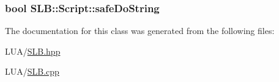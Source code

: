 \subsubsection[{\texorpdfstring{safe\+Do\+String}{safeDoString}}]{\setlength{\rightskip}{0pt plus 5cm}bool S\+L\+B\+::\+Script\+::safe\+Do\+String}\hypertarget{classSLB_1_1Script_a7ee7f0a0a77753eea4705df0ff3ec23c}{}\label{classSLB_1_1Script_a7ee7f0a0a77753eea4705df0ff3ec23c}


The documentation for this class was generated from the following files\+:\begin{DoxyCompactItemize}
\item 
L\+U\+A/\hyperlink{SLB_8hpp}{S\+L\+B.\+hpp}\item 
L\+U\+A/\hyperlink{SLB_8cpp}{S\+L\+B.\+cpp}\end{DoxyCompactItemize}
